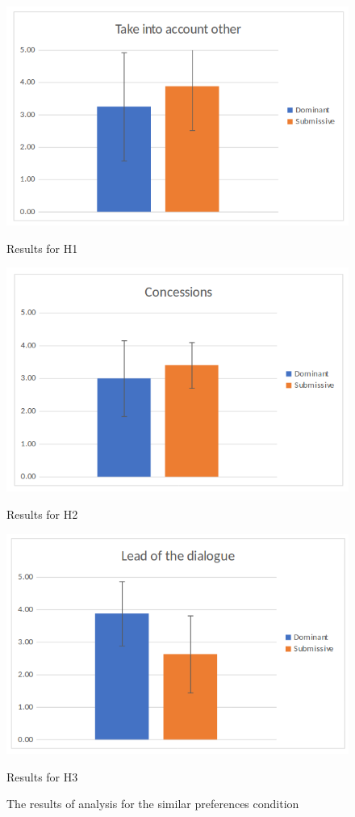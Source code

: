 \documentclass{llncs}
\begin{document}
		\begin{figure}[!htb]
			\includegraphics[width=\linewidth]{plots/H4/other.png}
			\caption{Results for H1}\label{fig:other}
			\endminipage\hfill
			\includegraphics[width=\linewidth]{plots/H4/concession.png}
			\caption{Results for H2}\label{fig:concede}
			\endminipage\hfill
			\includegraphics[width=\linewidth]{plots/H4/lead.png}
			\caption{Results for H3}\label{fig:lead}
			\endminipage
			
			\caption{\label{fig:H4} The results of analysis for the similar preferences condition}
		\end{figure}
				
\end{document}
